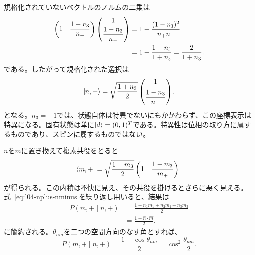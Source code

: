 規格化されていないベクトルのノルムの二乗は
\begin{align}
  \begin{pmatrix}
    1&\dfrac{1-n_3}{n_+}
  \end{pmatrix}
  \begin{pmatrix}
    1\\[3pt]\dfrac{1-n_3}{n_-}
  \end{pmatrix}
  &=
  1+\frac{(1-n_3)^2}{n_+n_-}
  \notag\\
  &=
  1+\frac{1-n_3}{1+n_3}
  =
  \frac{2}{1+n_3}.
  \label{eq:l04-unnormalized-norm}
\end{align}
である。したがって規格化された選択は
\begin{equation}
  \left\lvert n,+\right\rangle
  =
  \sqrt{\frac{1+n_3}{2}}
  \begin{pmatrix}
    1\\[5pt]\dfrac{1-n_3}{n_-}
  \end{pmatrix}.
  \label{eq:l04-normalized-n-state}
\end{equation}
となる。\(n_3=-1\)では、状態自体は特異でないにもかかわらず、この座標表示は特異になる。固有状態は単に\(\left\lvert d\right\rangle=(0,1)^T\)である。特異性は位相の取り方に属するものであり、スピンに属するものではない。

\(n\)を\(m\)に置き換えて複素共役をとると
\begin{equation}
  \left\langle m,+\right\rvert
  =
  \sqrt{\frac{1+m_3}{2}}
  \begin{pmatrix}
    1&
    \dfrac{1-m_3}{m_+}
  \end{pmatrix}.
\end{equation}
が得られる。この内積は不快に見え、その共役を掛けるとさらに悪く見える。式~\eqref{eq:l04-nplus-nminus}を繰り返し用いると、結果は
\begin{equation}
  \begin{aligned}
    P(m,+\mid n,+)
    &=\frac{1+n_1m_1+n_2m_2+n_3m_3}{2}\\
    &=\frac{1+\hat n\cdot\hat m}{2}.
  \end{aligned}
  \label{eq:l04-spin-transition-probability}
\end{equation}
に簡約される。\(\theta_{nm}\)を二つの空間方向のなす角とすれば、
\begin{equation}
  P(m,+\mid n,+)
  =
  \frac{1+\cos\theta_{nm}}{2}
  =
  \cos^2\frac{\theta_{nm}}{2}.
  \label{eq:l04-half-angle-probability}
\end{equation}

\begin{classroomqa}
\end{classroomqa}

